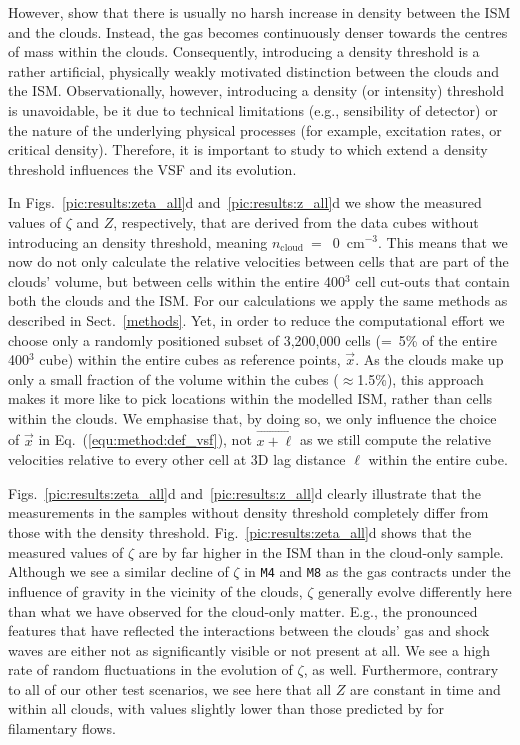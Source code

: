 However,  show that there is usually no harsh increase in density between the ISM and the clouds. 
Instead, the gas becomes continuously denser towards the centres of mass within the clouds. Consequently, introducing a density threshold is a rather artificial, physically weakly motivated distinction between the clouds and the ISM.
Observationally, however, introducing a density (or intensity) threshold is unavoidable, be it due to technical limitations (e.g., sensibility of detector) or the nature of the underlying physical processes (for example, excitation rates, or critical density).
Therefore, it is important to study to which extend a density threshold influences the VSF and its evolution.

In Figs.~\ref{pic:results:zeta_all}d and~\ref{pic:results:z_all}d we show the measured values of $\zeta$ and $Z$, respectively, that are derived from the data cubes without introducing an density threshold, meaning $n_\mathrm{cloud}~=$~0~cm$^{-3}$.
This means that we now do not only calculate the relative velocities between cells that are part of the clouds' volume, but between cells within the entire 400$^3$ cell cut-outs that contain both the clouds and the ISM.
For our calculations we apply the same methods as described in Sect.~\ref{methods}. 
Yet, in order to reduce the computational effort we choose only a randomly positioned subset of 3,200,000 cells (=~5\% of the entire 400$^3$ cube) within the entire cubes as reference points, $\vec{x}$. 
As the clouds make up only a small fraction of the volume within the cubes ($\approx$1.5\%), this approach makes it more like to pick locations within the modelled ISM, rather than cells within the clouds. 
We emphasise that, by doing so, we only influence the choice of $\vec{x}$ in Eq.~(\ref{equ:method:def_vsf}), not $\vec{x+\ell}$ as we still compute the relative velocities relative to every other cell at 3D lag distance $\ell$ within the entire cube. 

Figs.~\ref{pic:results:zeta_all}d and~\ref{pic:results:z_all}d clearly illustrate that the measurements in the samples without density threshold completely differ from those with the density threshold.
Fig.~\ref{pic:results:zeta_all}d shows that the measured values of $\zeta$ are by far higher in the ISM than in the cloud-only sample.
Although we see a similar decline of $\zeta$ in \texttt{M4} and \texttt{M8} as the gas contracts under the influence of gravity in the vicinity of the clouds, $\zeta$ generally evolve differently here than what we have observed for the cloud-only matter.
E.g., the pronounced features that have reflected the interactions between the clouds' gas and shock waves are either not as significantly visible or not present at all.
We see a high rate of random fluctuations in the evolution of $\zeta$, as well.
Furthermore, contrary to all of our other test scenarios, we see here that all $Z$ are constant in time and within all clouds, with values slightly lower than those predicted by \citet{She1994} for filamentary flows.


